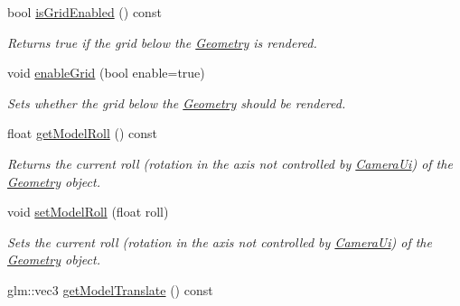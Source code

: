 \begin{DoxyCompactItemize}
bool \mbox{\hyperlink{classpepr3d_1_1_model_view_af233e744e89acdc27258033377f9f14e}{is\+Grid\+Enabled}} () const
\begin{DoxyCompactList}\small\item\em Returns true if the grid below the \mbox{\hyperlink{classpepr3d_1_1_geometry}{Geometry}} is rendered. \end{DoxyCompactList}\item 
\mbox{\label{classpepr3d_1_1_model_view_a43a0d49736a4f8b204b93594d964f308}} 
void \mbox{\hyperlink{classpepr3d_1_1_model_view_a43a0d49736a4f8b204b93594d964f308}{enable\+Grid}} (bool enable=true)
\begin{DoxyCompactList}\small\item\em Sets whether the grid below the \mbox{\hyperlink{classpepr3d_1_1_geometry}{Geometry}} should be rendered. \end{DoxyCompactList}\item 
\mbox{\label{classpepr3d_1_1_model_view_a359a106369373c8e669649fac95e8cf4}} 
float \mbox{\hyperlink{classpepr3d_1_1_model_view_a359a106369373c8e669649fac95e8cf4}{get\+Model\+Roll}} () const
\begin{DoxyCompactList}\small\item\em Returns the current roll (rotation in the axis not controlled by \mbox{\hyperlink{classpepr3d_1_1_camera_ui}{Camera\+Ui}}) of the \mbox{\hyperlink{classpepr3d_1_1_geometry}{Geometry}} object. \end{DoxyCompactList}\item 
\mbox{\label{classpepr3d_1_1_model_view_a91d166d8c1ff522ed0b37ba9e4a16501}} 
void \mbox{\hyperlink{classpepr3d_1_1_model_view_a91d166d8c1ff522ed0b37ba9e4a16501}{set\+Model\+Roll}} (float roll)
\begin{DoxyCompactList}\small\item\em Sets the current roll (rotation in the axis not controlled by \mbox{\hyperlink{classpepr3d_1_1_camera_ui}{Camera\+Ui}}) of the \mbox{\hyperlink{classpepr3d_1_1_geometry}{Geometry}} object. \end{DoxyCompactList}\item 
\mbox{\label{classpepr3d_1_1_model_view_aa02348736ac32b98423eb091c74ee0a2}} 
glm\+::vec3 \mbox{\hyperlink{classpepr3d_1_1_model_view_aa02348736ac32b98423eb091c74ee0a2}{get\+Model\+Translate}} () const

\end{DoxyCompactItemize}

